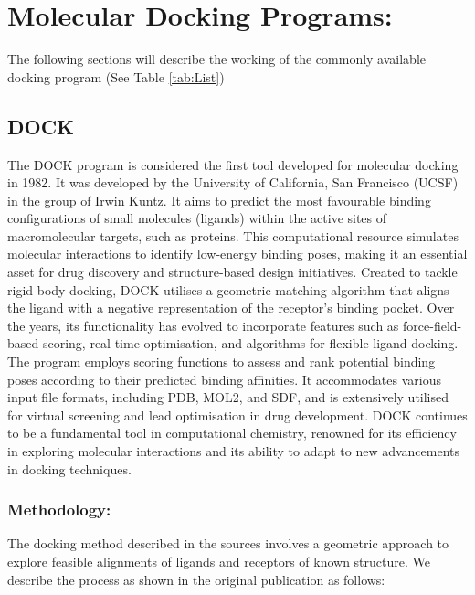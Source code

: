 \documentclass[11pt]{article}
\begin{document}
\section*{Molecular Docking Programs:}
The following sections will describe the working of the commonly available docking program (See Table \ref{tab:List})

\subsection*{DOCK}
The DOCK program is considered the first tool developed for molecular docking in 1982\cite{bib71}. It was developed by the University of California, San Francisco (UCSF) in the group of Irwin Kuntz. It aims to predict the most favourable binding configurations of small molecules (ligands) within the active sites of macromolecular targets, such as proteins. This computational resource simulates molecular interactions to identify low-energy binding poses, making it an essential asset for drug discovery and structure-based design initiatives. Created to tackle rigid-body docking, DOCK utilises a geometric matching algorithm that aligns the ligand with a negative representation of the receptor's binding pocket. Over the years, its functionality has evolved to incorporate features such as force-field-based scoring, real-time optimisation, and algorithms for flexible ligand docking\cite{bib18}. The program employs scoring functions to assess and rank potential binding poses according to their predicted binding affinities. It accommodates various input file formats, including PDB, MOL2, and SDF, and is extensively utilised for virtual screening and lead optimisation in drug development. DOCK continues to be a fundamental tool in computational chemistry, renowned for its efficiency in exploring molecular interactions and its ability to adapt to new advancements in docking techniques.

\subsubsection*{Methodology:} The docking method described in the sources involves a geometric approach to explore feasible alignments of ligands and receptors of known structure. We describe the process as shown in the original publication\cite{bib71} as follows:
\end{document}
